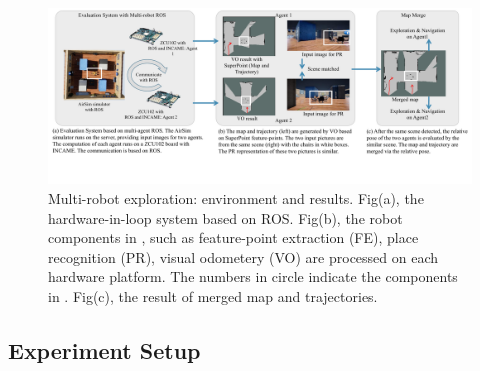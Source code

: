 \label{sec:experiments}


\begin{figure}[t]
  \centering
  \includegraphics[width=0.99\linewidth]{fig/env.pdf}
  \caption{Multi-robot exploration: environment and results. Fig(a), the hardware-in-loop system based on ROS. Fig(b), the robot components in , such as feature-point extraction (FE), place recognition (PR), visual odometery (VO) are processed on each hardware platform. The numbers in circle indicate the components in . Fig(c), the result of merged map and trajectories.}
  \label{fig:env}
\end{figure}





\subsection{ Experiment Setup }

